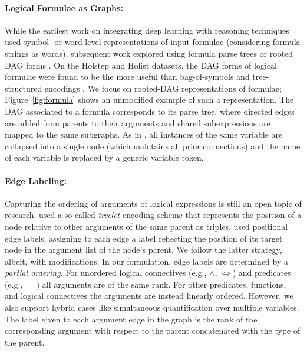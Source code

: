 \documentclass{article}
\begin{document}
\paragraph{Logical Formulae as Graphs:} While the earliest work on integrating deep learning with reasoning techniques used symbol- or word-level representations of input formulae \cite{irving2016deepmath,kaliszyk2017holstep} (considering formula strings as words), subsequent work explored using formula parse trees \cite{loos2017deep,evans2018can,huang2018gamepad} or rooted DAG forms \cite{wang2017premise,paliwal2019graph}. On the Holstep \cite{kaliszyk2017holstep} and Holist \cite{bansal2019holist} datasets, the DAG forms of logical formulae were found to be the more useful than bag-of-symbols and tree-structured encodings \cite{wang2017premise,paliwal2019graph}. We focus on rooted-DAG representations of formulae; Figure~\ref{fig:formula} shows an unmodified example of such a representation. The DAG associated to a formula corresponds to its parse tree, where directed edges are added from parents to their arguments and shared subexpressions are mapped to the same subgraphs. As in \cite{wang2017premise}, all instances of the same variable are collapsed into a single node (which maintains all prior connections) and the name of each variable is replaced by a generic variable token.

\paragraph{Edge Labeling:}
\label{sec:edge_labels}
Capturing the ordering of arguments of logical expressions is still an open topic of research. \cite{wang2017premise} used a so-called \emph{treelet} encoding scheme that represents the position of a node relative to other arguments of the same parent as triples. \cite{paliwal2019graph} used positional edge labels, assigning to each edge a label reflecting the position of its target node in the argument list of the node's parent.
We follow the latter strategy, albeit, with modifications. In our formulation, edge labels are determined by a \textit{partial ordering}. For unordered logical connectives (e.g., $\wedge$, $\Leftrightarrow$) and predicates (e.g., $=$) all arguments are of the same rank. For other predicates, functions, and logical connectives the arguments are instead linearly ordered. However, we also support hybrid cases like simultaneous quantification over multiple variables. 
The label given to each argument edge in the graph is the rank of the corresponding argument with respect to the parent concatenated with the type of the parent.
\end{document}
